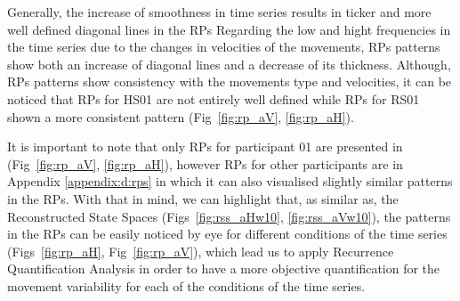 Generally, the increase of smoothness in time series results in ticker 
and more well defined diagonal lines in the RPs 
Regarding the low and hight frequencies in the time series due to the 
changes in velocities of the movements, RPs patterns
show both an increase of diagonal lines and a decrease of its thickness.
Although, RPs patterns show consistency with the movements type and velocities,
it can be noticed that RPs for HS01 are not entirely well defined
while RPs for RS01 shown a more consistent pattern
(Fig~\ref{fig:rp_aV}, \ref{fig:rp_aH}). 

It is important to note that only RPs for participant 01 are presented
in (Fig~\ref{fig:rp_aV}, \ref{fig:rp_aH}), however
RPs for other participants are in Appendix \ref{appendix:d:rps} in which 
it can also visualised slightly similar patterns in the RPs.
With that in mind, we can highlight that, as similar as, the 
Reconstructed State Spaces (Figs~\ref{fig:rss_aHw10}, \ref{fig:rss_aVw10}), 
the patterns in the RPs can be easily noticed by eye for different conditions 
of the time series (Figs~\ref{fig:rp_aH}, Fig~\ref{fig:rp_aV}),
which lead us to apply Recurrence Quantification Analysis 
in order to have a more objective quantification for the movement 
variability for each of the conditions of the time series.

